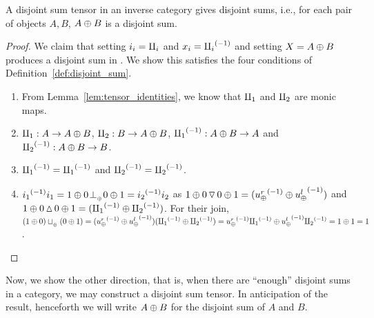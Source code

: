 
\begin{proposition}\label{prop:a_disjoint_sum_tensor_gives_disjoint_sums}
  A disjoint sum tensor in an inverse category \X gives disjoint sums, i.e., for each pair of
  objects $A,B$, $A\oplus B$ is a disjoint sum.
\end{proposition}
\begin{proof}
  We claim that setting $i_i = \amalg_{i}$ and $x_i = {\amalg_{i}}^{(-1)}$ and setting $X = A\oplus B$ produces a disjoint
  sum in \X. We show this satisfies the four conditions of Definition~\ref{def:disjoint_sum}.
  \begin{enumerate}[{(}i{)}]
    \item From Lemma~\ref{lem:tensor_identities}, we know that $\amalg_{1}$ and $\amalg_{2}$ are monic maps.
    \item $\amalg_{1} : A \to A\oplus B$, $\amalg_{2}: B \to A\oplus B$, ${\amalg_{1}}^{(-1)}: A\oplus B \to A$ and ${\amalg_{2}}^{(-1)}: A\oplus B \to B$.
    \item ${\amalg_{1}}^{(-1)} = {\amalg_{1}}^{(-1)}$ and ${\amalg_{2}}^{(-1)} = {\amalg_{2}}^{(-1)}$.
    \item ${i_1}^{(-1)}i_1 = 1\oplus 0 {}_{{}_{}}{\perp_{{}_{\oplus}}} 0\oplus1 = {i_2}^{(-1)}i_2$ as
      $1\oplus0 \operatorname{\triangledown} 0\oplus1 = ({u_{\oplus}^r}^{(-1)}\oplus{\ensuremath{u_{\oplus}^l}}^{(-1)})$ and
      $1\oplus0 \operatorname{\vartriangle} 0\oplus1 = ({\amalg_{1}}^{(-1)}\oplus{\amalg_{2}}^{(-1)})$. For their join,
      $(1\oplus0)\sqcup_{{_{\oplus}}} (0\oplus1) = ({u_{\oplus}^r}^{(-1)}\oplus{\ensuremath{u_{\oplus}^l}}^{(-1)})({\amalg_{1}}^{(-1)}\oplus{\amalg_{2}}^{(-1)}) =
      {u_{\oplus}^r}^{(-1)}{\amalg_{1}}^{(-1)} \oplus {\ensuremath{u_{\oplus}^l}}^{(-1)}{\amalg_{2}}^{(-1)} = 1\oplus1 = 1$.
  \end{enumerate}
\end{proof}

Now, we show the other direction, that is, when there are ``enough'' disjoint sums in a category, we
may construct a disjoint sum tensor. In anticipation of the result, henceforth we will write $A\oplus B$
for the disjoint sum of $A$ and $B$.


